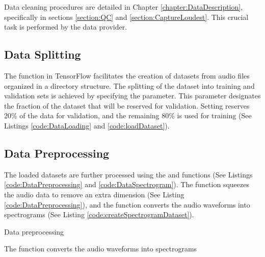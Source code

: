 Data cleaning procedures are detailed in Chapter \ref{chapter:DataDescription}, specifically in sections \ref{section:QC} and \ref{section:CaptureLoudest}. This crucial task is performed by the data provider.

\subsection{Data Splitting}

The  function in TensorFlow facilitates the creation of datasets from audio files organized in a directory structure. The splitting of the dataset into training and validation sets is achieved by specifying the  parameter. This parameter designates the fraction of the dataset that will be reserved for validation. Setting  reserves 20\% of the data for validation, and the remaining 80\% is used for training (See Listings \ref{code:DataLoading} and \ref{code:loadDataset}).

\subsection{Data Preprocessing}

The loaded datasets are further processed using the  and  functions (See Listings \ref{code:DataPreprocessing} and \ref{code:DataSpectrogram}). The  function squeezes the audio data to remove an extra dimension (See Listing \ref{code:DataPreprocessing}), and the  function converts the audio waveforms into spectrograms (See Listing \ref{code:createSpectrogramDataset}). 

\begin{code}[h!]
	    
	
	\caption{Data preprocessing}
	\label{code:DataPreprocessing}
\end{code}

\begin{code}[h!]
	    
	
	\caption{The  function converts the audio waveforms into spectrograms}
	\label{code:DataSpectrogram}
\end{code}

